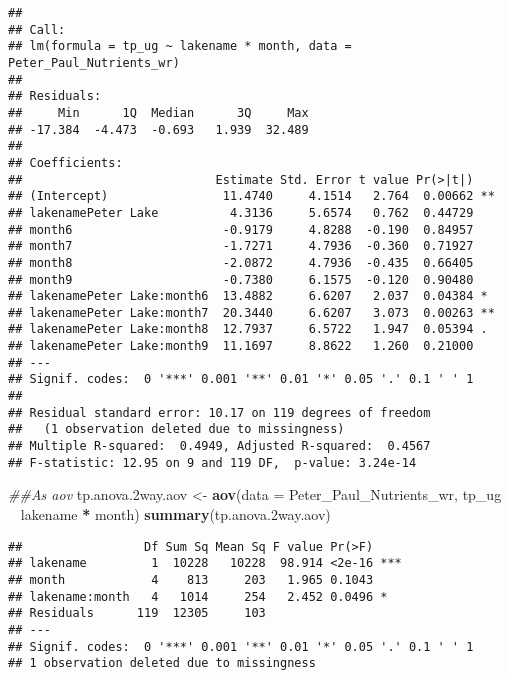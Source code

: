 \documentclass[]{article}
\newenvironment{Shaded}{\begin{snugshade}}{\end{snugshade}}
\newcommand{\CommentTok}[1]{\textcolor[rgb]{0.56,0.35,0.01}{\textit{#1}}}
\newcommand{\DataTypeTok}[1]{\textcolor[rgb]{0.13,0.29,0.53}{#1}}
\newcommand{\FloatTok}[1]{\textcolor[rgb]{0.00,0.00,0.81}{#1}}
\newcommand{\KeywordTok}[1]{\textcolor[rgb]{0.13,0.29,0.53}{\textbf{#1}}}
\newcommand{\NormalTok}[1]{#1}
\newcommand{\OperatorTok}[1]{\textcolor[rgb]{0.81,0.36,0.00}{\textbf{#1}}}
\newcommand{\StringTok}[1]{\textcolor[rgb]{0.31,0.60,0.02}{#1}}
\begin{document}
\begin{verbatim}
## 
## Call:
## lm(formula = tp_ug ~ lakename * month, data = Peter_Paul_Nutrients_wr)
## 
## Residuals:
##     Min      1Q  Median      3Q     Max 
## -17.384  -4.473  -0.693   1.939  32.489 
## 
## Coefficients:
##                           Estimate Std. Error t value Pr(>|t|)   
## (Intercept)                11.4740     4.1514   2.764  0.00662 **
## lakenamePeter Lake          4.3136     5.6574   0.762  0.44729   
## month6                     -0.9179     4.8288  -0.190  0.84957   
## month7                     -1.7271     4.7936  -0.360  0.71927   
## month8                     -2.0872     4.7936  -0.435  0.66405   
## month9                     -0.7380     6.1575  -0.120  0.90480   
## lakenamePeter Lake:month6  13.4882     6.6207   2.037  0.04384 * 
## lakenamePeter Lake:month7  20.3440     6.6207   3.073  0.00263 **
## lakenamePeter Lake:month8  12.7937     6.5722   1.947  0.05394 . 
## lakenamePeter Lake:month9  11.1697     8.8622   1.260  0.21000   
## ---
## Signif. codes:  0 '***' 0.001 '**' 0.01 '*' 0.05 '.' 0.1 ' ' 1
## 
## Residual standard error: 10.17 on 119 degrees of freedom
##   (1 observation deleted due to missingness)
## Multiple R-squared:  0.4949, Adjusted R-squared:  0.4567 
## F-statistic: 12.95 on 9 and 119 DF,  p-value: 3.24e-14
\end{verbatim}

\begin{Shaded}
\begin{Highlighting}[]
\CommentTok{##As aov}
\NormalTok{tp.anova}\FloatTok{.2}\NormalTok{way.aov <-}\StringTok{ }\KeywordTok{aov}\NormalTok{(}\DataTypeTok{data =}\NormalTok{ Peter_Paul_Nutrients_wr, }
\NormalTok{                         tp_ug }\OperatorTok{~}\StringTok{ }\NormalTok{lakename }\OperatorTok{*}\StringTok{ }\NormalTok{month) }
\KeywordTok{summary}\NormalTok{(tp.anova}\FloatTok{.2}\NormalTok{way.aov)}
\end{Highlighting}
\end{Shaded}

\begin{verbatim}
##                 Df Sum Sq Mean Sq F value Pr(>F)    
## lakename         1  10228   10228  98.914 <2e-16 ***
## month            4    813     203   1.965 0.1043    
## lakename:month   4   1014     254   2.452 0.0496 *  
## Residuals      119  12305     103                   
## ---
## Signif. codes:  0 '***' 0.001 '**' 0.01 '*' 0.05 '.' 0.1 ' ' 1
## 1 observation deleted due to missingness
\end{verbatim}
\end{document}
